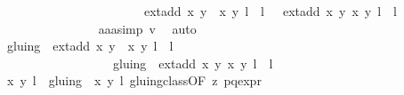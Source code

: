 \begin{isabellebody}
\ \ \ \ \ \ \ \ \ \ \ \ \ \ \ \ \ \ \ \ \ \ \ {\isacharbraceleft}{\isacharparenleft}ext{\isacharunderscore}add\ {\isacharparenleft}x{\isacharcomma}\ y{\isacharparenright}\ {\isacharparenleft}{\isasymtau}\ {\isacharparenleft}x{\isacharprime}{\isacharcomma}\ y{\isacharprime}{\isacharparenright}{\isacharparenright}{\isacharcomma}\ l\ {\isacharplus}\ l{\isacharprime}\ {\isacharplus}\ {}{\isacharparenright}{\isacharcomma}\ {\isacharparenleft}ext{\isacharunderscore}add\ {\isacharparenleft}x{\isacharcomma}\ y{\isacharparenright}\ {\isacharparenleft}x{\isacharprime}{\isacharcomma}\ y{\isacharprime}{\isacharparenright}{\isacharcomma}\ l\ {\isacharplus}\ l{\isacharprime}{\isacharparenright}{\isacharbraceright}{\isachardoublequoteclose}\isanewline
\ \ \ \ \ \ \ \ \ \ \ \ \ \ \isamarkupfalse%
\ aaa{\isacharunderscore}simp\ v{}\ \isamarkupfalse%
\ auto\ \ \ \ \ \ \ \ \ \ \isanewline
\ \ \ \ \ \ \ \ \ \ \ \ \isamarkupfalse%
\ {\isachardoublequoteopen}gluing\ {\isacharbackquote}{\isacharbackquote}\ {\isacharbraceleft}{\isacharparenleft}ext{\isacharunderscore}add\ {\isacharparenleft}x{\isacharcomma}\ y{\isacharparenright}\ {\isacharparenleft}{\isasymtau}\ {\isacharparenleft}x{\isacharprime}{\isacharcomma}\ y{\isacharprime}{\isacharparenright}{\isacharparenright}{\isacharcomma}\ l\ {\isacharplus}\ l{\isacharprime}\ {\isacharplus}\ {}{\isacharparenright}{\isacharbraceright}\ {\isacharequal}\isanewline
\ \ \ \ \ \ \ \ \ \ \ \ \ \ \ \ \ \ gluing\ {\isacharbackquote}{\isacharbackquote}\ {\isacharbraceleft}{\isacharparenleft}ext{\isacharunderscore}add\ {\isacharparenleft}x{\isacharcomma}\ y{\isacharparenright}\ {\isacharparenleft}x{\isacharprime}{\isacharcomma}\ y{\isacharprime}{\isacharparenright}{\isacharcomma}\ l\ {\isacharplus}\ l{\isacharprime}{\isacharparenright}{\isacharbraceright}{\isachardoublequoteclose}\ \isanewline
\ \ \ \ \ \ \ \ \ \ \ \ \ \ \isamarkupfalse%
\ {\isacartoucheopen}{\isacharbraceleft}{\isacharparenleft}{\isacharparenleft}x{\isacharcomma}\ y{\isacharparenright}{\isacharcomma}\ l{\isacharparenright}{\isacharbraceright}\ {\isacharslash}{\isacharslash}\ gluing\ {\isacharequal}\ {\isacharbraceleft}{\isacharbraceleft}{\isacharparenleft}{\isacharparenleft}x{\isacharcomma}\ y{\isacharparenright}{\isacharcomma}\ l{\isacharparenright}{\isacharbraceright}{\isacharbraceright}{\isacartoucheclose}\ gluing{\isacharunderscore}class{\isacharbrackleft}OF\ z{}\ p{\isacharunderscore}q{\isacharunderscore}expr{\isacharparenleft}{}{\isacharparenright}{\isacharbrackright}\ \isanewline

\end{isabellebody}

